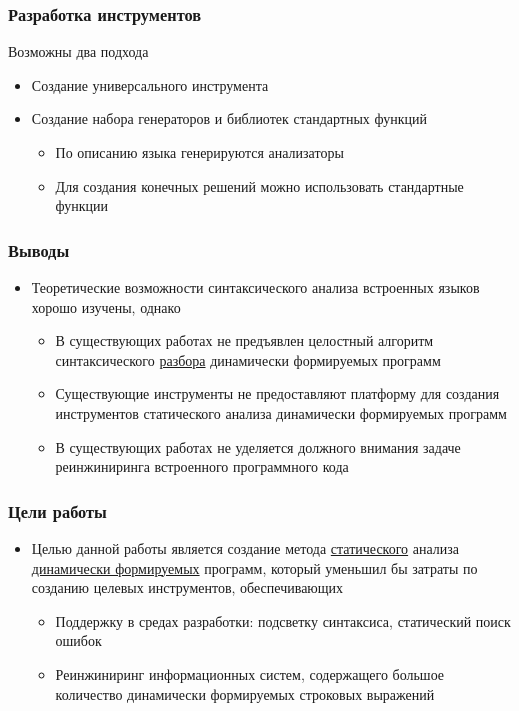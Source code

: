 \documentclass{beamer}
\begin{document}
\begin{frame}
    \transwipe[direction=90]
    \frametitle{Разработка инструментов}
    Возможны два подхода  
    \begin{itemize}
      \item Создание универсального инструмента
      \item Создание набора генераторов и библиотек стандартных функций
      \begin{itemize}
        \item По описанию языка генерируются анализаторы
        \item Для создания конечных решений можно использовать стандартные функции
      \end{itemize}
    \end{itemize}
\end{frame}

\begin{frame}
    \transwipe[direction=90]
    \frametitle{Выводы}
    \begin{itemize}
      \item Теоретические возможности синтаксического анализа встроенных языков хорошо изучены, однако
      \begin{itemize}
        \item В существующих работах не предъявлен целостный алгоритм синтаксического \underline{разбора} динамически формируемых программ
        \item Существующие инструменты не предоставляют платформу для создания инструментов статического анализа динамически формируемых программ
        \item В существующих работах не уделяется должного внимания задаче реинжиниринга встроенного программного кода
      \end{itemize}
    \end{itemize}
\end{frame}

\begin{frame}
    \transwipe[direction=90]
    \frametitle{Цели работы}
    \begin{itemize}
        \item Целью данной работы является создание метода \underline{статического} анализа \underline{динамически формируемых} программ, 
        который уменьшил бы затраты по созданию целевых инструментов, обеспечивающих
        \begin{itemize}
            \item Поддержку в средах разработки: подсветку синтаксиса, статический поиск ошибок
            \item Реинжиниринг информационных систем, содержащего большое количество динамически формируемых строковых 
        выражений
        \end{itemize}
    \end{itemize}
\end{frame}
\end{document}
